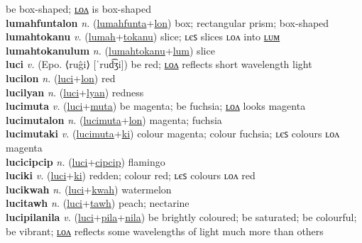 be box-shaped; \hyperref[lumahfuntalon]{ʟᴏᴧ} is box-shaped \label{lumahfunta} \\
\textbf{lumahfuntalon} \textit{n.} (\hyperref[lumahfunta]{lumahfunta}+\hyperref[lon]{lon})
box; rectangular prism; box-shaped \label{lumahfuntalon} \\
\textbf{lumahtokanu} \textit{v.} (\hyperref[lumah]{lumah}+\hyperref[tokanu]{tokanu})
slice; ʟєꜱ slices ʟᴏᴧ into \hyperref[lumahtokanulum]{ʟᴜᴍ} \label{lumahtokanu} \\
\textbf{lumahtokanulum} \textit{n.} (\hyperref[lumahtokanu]{lumahtokanu}+\hyperref[lum]{lum})
slice \label{lumahtokanulum} \\
\textbf{luci} \textit{v.} (Epo. ⟨ruĝi⟩ [ˈrud͡ʒi])
be red; \hyperref[lucilon]{ʟᴏᴧ} reflects short wavelength light \label{luci} \\
\textbf{lucilon} \textit{n.} (\hyperref[luci]{luci}+\hyperref[lon]{lon})
red \label{lucilon} \\
\textbf{lucilyan} \textit{n.} (\hyperref[luci]{luci}+\hyperref[lyan]{lyan})
redness \label{lucilyan} \\
\textbf{lucimuta} \textit{v.} (\hyperref[luci]{luci}+\hyperref[muta]{muta})
be magenta; be fuchsia; \hyperref[lucimutalon]{ʟᴏᴧ} looks magenta \label{lucimuta} \\
\textbf{lucimutalon} \textit{n.} (\hyperref[lucimuta]{lucimuta}+\hyperref[lon]{lon})
magenta; fuchsia \label{lucimutalon} \\
\textbf{lucimutaki} \textit{v.} (\hyperref[lucimuta]{lucimuta}+\hyperref[ki]{ki})
colour magenta; colour fuchsia; ʟєꜱ colours ʟᴏᴧ magenta \label{lucimutaki} \\
\textbf{lucicipcip} \textit{n.} (\hyperref[luci]{luci}+\hyperref[cipcip]{cipcip})
flamingo \label{lucicipcip} \\
\textbf{luciki} \textit{v.} (\hyperref[luci]{luci}+\hyperref[ki]{ki})
redden; colour red; ʟєꜱ colours ʟᴏᴧ red \label{luciki} \\
\textbf{lucikwah} \textit{n.} (\hyperref[luci]{luci}+\hyperref[kwah]{kwah})
watermelon \label{lucikwah} \\
\textbf{lucitawh} \textit{n.} (\hyperref[luci]{luci}+\hyperref[tawh]{tawh})
peach; nectarine \label{lucitawh} \\
\textbf{lucipilanila} \textit{v.} (\hyperref[luci]{luci}+\hyperref[pila]{pila}+\hyperref[nila]{nila})
be brightly coloured; be saturated; be colourful; be vibrant; \hyperref[lucipilanilalon]{ʟᴏᴧ} reflects some wavelengths of light much more than others \label{lucipilanila} \\
